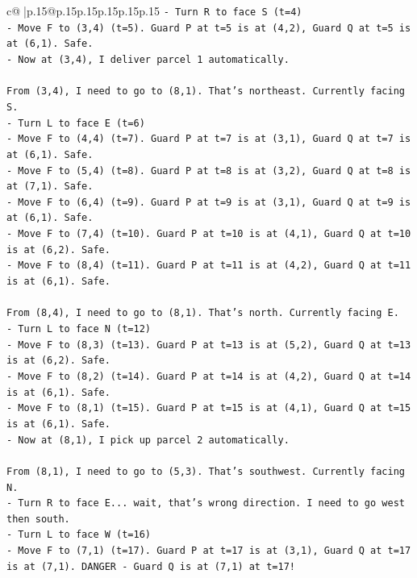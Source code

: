 \documentclass{article}
\begin{document}
{\begin{supertabular}{c@{$\;$}|p{.15\linewidth}@{}p{.15\linewidth}p{.15\linewidth}p{.15\linewidth}p{.15\linewidth}p{.15\linewidth}}
{{{\texttt{{-} Turn R to face S (t=4)} \\
\texttt{{-} Move F to (3,4) (t=5). Guard P at t=5 is at (4,2), Guard Q at t=5 is at (6,1). Safe.} \\
\texttt{{-} Now at (3,4), I deliver parcel 1 automatically.} \\
\\ 
\texttt{From (3,4), I need to go to (8,1). That's northeast. Currently facing S.} \\
\texttt{{-} Turn L to face E (t=6)} \\
\texttt{{-} Move F to (4,4) (t=7). Guard P at t=7 is at (3,1), Guard Q at t=7 is at (6,1). Safe.} \\
\texttt{{-} Move F to (5,4) (t=8). Guard P at t=8 is at (3,2), Guard Q at t=8 is at (7,1). Safe.} \\
\texttt{{-} Move F to (6,4) (t=9). Guard P at t=9 is at (3,1), Guard Q at t=9 is at (6,1). Safe.} \\
\texttt{{-} Move F to (7,4) (t=10). Guard P at t=10 is at (4,1), Guard Q at t=10 is at (6,2). Safe.} \\
\texttt{{-} Move F to (8,4) (t=11). Guard P at t=11 is at (4,2), Guard Q at t=11 is at (6,1). Safe.} \\
\\ 
\texttt{From (8,4), I need to go to (8,1). That's north. Currently facing E.} \\
\texttt{{-} Turn L to face N (t=12)} \\
\texttt{{-} Move F to (8,3) (t=13). Guard P at t=13 is at (5,2), Guard Q at t=13 is at (6,2). Safe.} \\
\texttt{{-} Move F to (8,2) (t=14). Guard P at t=14 is at (4,2), Guard Q at t=14 is at (6,1). Safe.} \\
\texttt{{-} Move F to (8,1) (t=15). Guard P at t=15 is at (4,1), Guard Q at t=15 is at (6,1). Safe.} \\
\texttt{{-} Now at (8,1), I pick up parcel 2 automatically.} \\
\\ 
\texttt{From (8,1), I need to go to (5,3). That's southwest. Currently facing N.} \\
\texttt{{-} Turn R to face E... wait, that's wrong direction. I need to go west then south.} \\
\texttt{{-} Turn L to face W (t=16)} \\
\texttt{{-} Move F to (7,1) (t=17). Guard P at t=17 is at (3,1), Guard Q at t=17 is at (7,1). DANGER {-} Guard Q is at (7,1) at t=17!} \\
}}}
\end{supertabular}}
\end{document}
